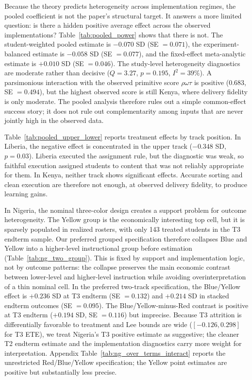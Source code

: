 \documentclass[11pt]{article}
\begin{document}
Because the theory predicts heterogeneity across implementation regimes, the pooled coefficient is not the paper's structural target. It answers a more limited question: is there a hidden positive average effect across the observed implementations? Table~\ref{tab:pooled_power} shows that there is not. The student-weighted pooled estimate is $-0.070$ SD (SE $=0.071$), the experiment-balanced estimate is $-0.058$ SD (SE $=0.077$), and the fixed-effect meta-analytic estimate is $+0.010$ SD (SE $=0.046$). The study-level heterogeneity diagnostics are moderate rather than decisive ($Q=3.27$, $p=0.195$, $I^2=39\%$). A parsimonious interaction with the observed primitive score $\rho\omega\tau$ is positive ($0.683$, SE $=0.494$), but the highest observed score is still Kenya, where delivery fidelity is only moderate. The pooled analysis therefore rules out a simple common-effect success story; it does not rule out complementarity among inputs that are never jointly high in the observed data.

Table~\ref{tab:pooled_upper_lower} reports treatment effects by track position. In Liberia, the negative effect is concentrated in the upper track ($-0.348$ SD, $p = 0.03$). Liberia executed the assignment rule, but the diagnostic was weak, so faithful execution assigned students to content that was not reliably appropriate for them. In Kenya, neither track shows significant effects. Accurate sorting and clean execution are therefore not enough, at observed delivery fidelity, to produce learning gains.

In Nigeria, the nominal three-color design creates a support problem for outcome heterogeneity. The Yellow group is the economically interesting top cell, but it is sparsely populated in realized rosters, with only 143 treated students in the T3 endterm sample. Our preferred grouped specification therefore collapses Blue and Yellow into a higher-level instructional group before estimation (Table~\ref{tab:ng_two_group}). This is fixed by support and implementation logic, not by outcome patterns: the collapse preserves the main economic contrast between lower-level and higher-level instruction while avoiding overinterpretation of a thin nominal cell. In the preferred two-track specification, the Blue/Yellow effect is $+0.236$ SD at T3 endterm (SE $=0.132$) and $+0.214$ SD in stacked endterm outcomes (SE $=0.095$). The Blue/Yellow-minus-Red contrast is positive at T3 endterm ($+0.194$ SD, SE $=0.116$) but imprecise. Because T3 attrition is differentially favorable to treatment and Lee bounds are wide ($[-0.126,0.298]$ for T3 ETE), we treat Nigeria's T3 positive estimate as suggestive; the cleaner T2 endterm estimate and the implementation diagnostics carry more weight for interpretation. Appendix Table~\ref{tab:ng_over_terms_interact} reports the unrestricted Red/Blue/Yellow specification; the Yellow point estimates are positive but substantially less precise.
\end{document}
